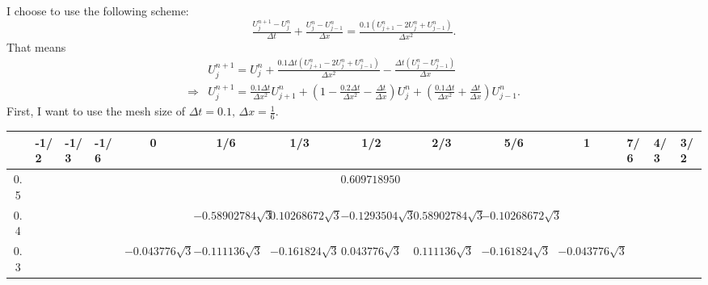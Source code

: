 \begin{answer}
    I choose to use the following scheme:
    \begin{equation}
        \tfrac{U_j^{n+1} - U_j^n}{\Delta t} + \tfrac{U_j^n-U_{j-1}^n}{\Delta x} = \tfrac{0.1(U_{j+1}^n - 2U_j^n + U_{j-1}^n)}{\Delta x^2}.
    \end{equation}
    That means
    \begin{equation}
        \begin{aligned}
        &U_j^{n+1} = U_j^n+\tfrac{0.1\Delta t(U_{j+1}^n - 2U_j^n + U_{j-1}^n)}{\Delta x^2}- \tfrac{\Delta t (U_j^n-U_{j-1}^n)}{\Delta x}\\
        \Rightarrow &U_j^{n+1} = \tfrac{0.1\Delta t}{\Delta x^2}U_{j+1}^n + (1-\tfrac{0.2\Delta t}{\Delta x^2} - \tfrac{\Delta t}{\Delta x})U_j^n + (\tfrac{0.1\Delta t}{\Delta x^2} + \tfrac{\Delta t}{\Delta x})U_{j-1}^n.
        \end{aligned}
    \end{equation}
    First, I want to use the mesh size of $\Delta t = 0.1, \, \Delta x = \tfrac{1}{6}$. 
    \begin{table}[H]
\centering
\begin{adjustbox}{width=\columnwidth,center}
\begin{tabular}{|c|l|l|l|c|c|c|c|c|c|c|l|l|l|}
\hline
\textbf{} & -1/2                   & -1/3                                 & -1/6                                 & 0                   & 1/6                   & 1/3                  & 1/2                  & 2/3                  & 5/6                   & 1                   & 7/6               & 4/3            & 3/2 \\ \hline
0.5       &                        &                                      &                                      &                     &                       &                      & $0.60971895015$  &                      &                       &                     &                   &                &     \\ \hline
0.4       &                        &                                      &                                      &                     & $-0.58902784\sqrt{3}$ & $0.10268672\sqrt{3}$ & $-0.1293504\sqrt{3}$ & $0.58902784\sqrt{3}$ & $-0.10268672\sqrt{3}$ &                     &                   &                &     \\ \hline
0.3       &                        &                                      &                                      & $-0.043776\sqrt{3}$ & $-0.111136\sqrt{3}$   & $-0.161824\sqrt{3}$  & $0.043776\sqrt{3}$   & $0.111136\sqrt{3}$   & $-0.161824\sqrt{3}$   & $-0.043776\sqrt{3}$ &                   &                &     \\ \hline

\end{tabular}
\end{adjustbox}
\end{table}
\end{answer}
